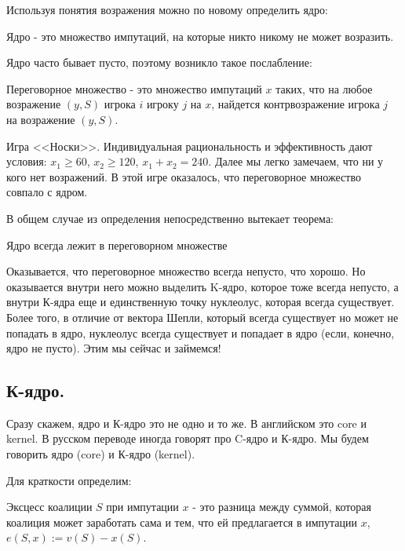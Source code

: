 Используя понятия возражения можно по новому определить ядро:

\begin{mydef}
Ядро  - это множество импутаций, на которые никто никому не может возразить.
\end{mydef}

Ядро часто бывает пусто, поэтому возникло такое послабление:

\begin{mydef}
Переговорное множество  - это множество импутаций $x$ таких, что на любое возражение $(y,S)$ игрока $i$ игроку $j$ на $x$, найдется контрвозражение игрока $j$ на возражение $(y,S)$.
\end{mydef}


\begin{myex} Игра <<Носки>>. Индивидуальная рациональность и эффективность дают условия: $x_{1}\geq 60$, $x_{2}\geq 120$, $x_{1}+x_{2}=240$. Далее мы легко замечаем, что ни у кого нет возражений. В этой игре оказалось, что переговорное множество совпало с ядром.
\end{myex}


В общем случае из определения непосредственно вытекает теорема:
\begin{myth}
Ядро всегда лежит в переговорном множестве
\end{myth}

Оказывается, что переговорное множество всегда непусто, что хорошо. Но оказывается внутри него можно выделить K-ядро, которое тоже всегда непусто, а внутри К-ядра еще и единственную точку нуклеолус, которая всегда существует. Более того, в отличие от вектора Шепли, который всегда существует но может не попадать в ядро, нуклеолус всегда существует и попадает в ядро (если, конечно, ядро не пусто). Этим мы сейчас и займемся!

\subsection{К-ядро.}

Сразу скажем, ядро и К-ядро это не одно и то же. В английском это core и kernel. В русском переводе иногда говорят про C-ядро и К-ядро. Мы будем говорить ядро (core) и К-ядро (kernel).

Для краткости определим:
\begin{mydef}
Эксцесс коалиции  $S$ при импутации $x$ - это разница между суммой, которая коалиция может заработать сама и тем, что ей предлагается в импутации $x$, $e(S,x):=v(S)-x(S)$.
\end{mydef}

